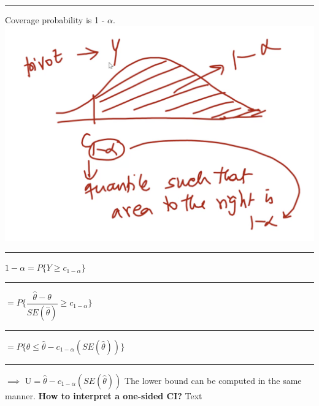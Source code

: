 \documentclass[]{article}
\begin{document}
\newline\Large\rule{3.0cm}{0pt} Coverage probability is 1 - $\alpha$.
\newline
\includegraphics[scale=0.6]{one_sided_ci}
\newline\Large\rule{3.0cm}{0pt}  $ 1- \alpha =  P \{ Y \ge  c_{1- \alpha}  \}$
\newline
\newline\Large\rule{4.3cm}{0pt}  $=  P \{ \dfrac{\hat{\theta} - \theta}{ SE(\hat{\theta})}  \ge  c_{1- \alpha}   \}$
\newline
\newline\Large\rule{4.3cm}{0pt}  $=  P \{ \theta \le \hat{\theta} -  c_{1- \alpha }(SE(\hat\theta))  \}$
\newline
\newline\Large\rule{2.8cm}{0pt} $\implies$  U$=  \hat{\theta} -  c_{1- \alpha }(SE(\hat\theta))$
\newline
\newline The lower bound can be computed in the same manner.
\newline
\newline \textbf{How to interpret a one-sided CI?}
\newline Text


 
\section{}
\end{document}
